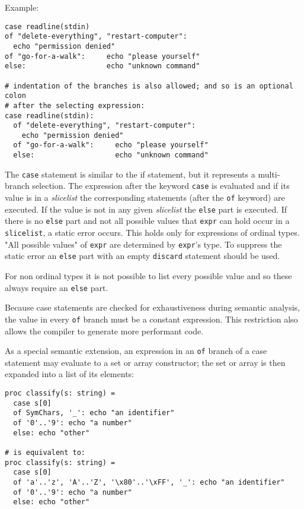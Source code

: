 Example:

\begin{verbatim}
case readline(stdin)
of "delete-everything", "restart-computer":
  echo "permission denied"
of "go-for-a-walk":     echo "please yourself"
else:                   echo "unknown command"

# indentation of the branches is also allowed; and so is an optional colon
# after the selecting expression:
case readline(stdin):
  of "delete-everything", "restart-computer":
    echo "permission denied"
  of "go-for-a-walk":     echo "please yourself"
  else:                   echo "unknown command"
\end{verbatim}

The \texttt{case} statement is similar to the if statement, but it
represents a multi-branch selection. The expression after the keyword
\texttt{case} is evaluated and if its value is in a \emph{slicelist} the
corresponding statements (after the \texttt{of} keyword) are executed.
If the value is not in any given \emph{slicelist} the \texttt{else} part
is executed. If there is no \texttt{else} part and not all possible
values that \texttt{expr} can hold occur in a \texttt{slicelist}, a
static error occurs. This holds only for expressions of ordinal types.
"All possible values" of \texttt{expr} are determined by \texttt{expr}'s
type. To suppress the static error an \texttt{else} part with an empty
\texttt{discard} statement should be used.

For non ordinal types it is not possible to list every possible value
and so these always require an \texttt{else} part.

Because case statements are checked for exhaustiveness during semantic
analysis, the value in every \texttt{of} branch must be a constant
expression. This restriction also allows the compiler to generate more
performant code.

As a special semantic extension, an expression in an \texttt{of} branch
of a case statement may evaluate to a set or array constructor; the set
or array is then expanded into a list of its elements:

\begin{verbatim}
proc classify(s: string) =
  case s[0]
  of SymChars, '_': echo "an identifier"
  of '0'..'9': echo "a number"
  else: echo "other"

# is equivalent to:
proc classify(s: string) =
  case s[0]
  of 'a'..'z', 'A'..'Z', '\x80'..'\xFF', '_': echo "an identifier"
  of '0'..'9': echo "a number"
  else: echo "other"
\end{verbatim}


